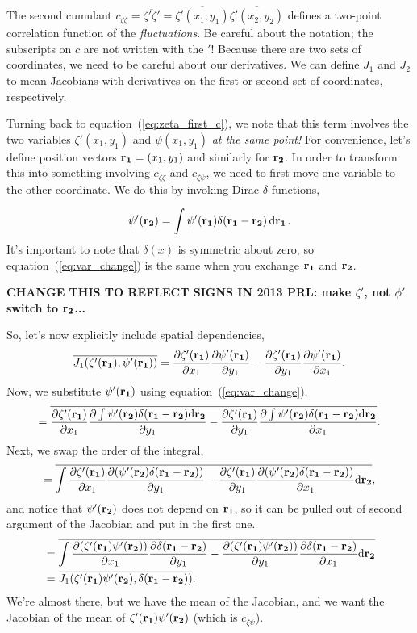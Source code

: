 \documentclass{paper}
\newcommand*{\mean}[1]{\overline{#1}}
\newcommand{\czz}{c_{\zeta\zeta}}
\newcommand{\czp}{c_{\zeta\psi}}
\newcommand{\rr}[1]{\vb{r_{#1}}}
\newcommand{\Jac}[3][]{\pdv{#2}{x_{#1}}\pdv{#3}{y_{#1}} - \pdv{#2}{y_{#1}}\pdv{#3}{x_{#1}}}
\begin{document}
The second cumulant $\czz = \mean{\zeta' \zeta'} = \mean{\zeta'(x_1, y_1)} \mean{\zeta'(x_2, y_2)}$ defines a two-point correlation function of the \emph{fluctuations}. Be careful about the notation; the subscripts on $c$ are not written with the $'$! Because there are two sets of coordinates, we need to be careful about our derivatives. We can define $J_1$ and $J_2$ to mean Jacobians with derivatives on the first or second set of coordinates, respectively.

Turning back to equation~(\ref{eq:zeta_first_c}), we note that this term involves the two variables $\zeta'(x_1, y_1)$ and $\psi(x_1, y_1)$ \emph{at the same point!} For convenience, let's define position vectors $\rr1 = (x_1, y_1)$ and similarly for $\rr2$. In order to transform this into something involving $\czz$ and $\czp$, we need to first move one variable to the other coordinate. We do this by invoking Dirac $\delta$ functions,

\begin{equation}
  \label{eq:var_change}
  \psi'(\rr2) = \int \psi'(\rr1) \delta(\rr1 - \rr2) \dd{\rr1}.
\end{equation}
It's important to note that $\delta(x)$ is symmetric about zero, so equation~(\ref{eq:var_change}) is the same when you exchange $\rr1$ and $\rr2$.

\textbf{CHANGE THIS TO REFLECT SIGNS IN 2013 PRL: make $\zeta'$, not $\phi'$ switch to $\rr2$...}

So, let's now explicitly include spatial dependencies,
\begin{equation}
  \label{eq:expanded_J1}
  \mean{J_1(\zeta'(\rr1), \psi'(\rr1))} = \Jac[1]{\zeta'(\rr1)}{\psi'(\rr1)}.
\end{equation}
Now, we substitute $\psi'(\rr1)$ using equation~(\ref{eq:var_change}),
\begin{equation}
  \label{eq:expanded_J1_int}
  = \mean{\Jac[1]{\zeta'(\rr1)}{\int \psi'(\rr2) \delta(\rr1 - \rr2) \dd \rr2}}.
\end{equation}
Next, we swap the order of the integral,
\begin{equation}
  \label{eq:expanded_J1_int_swap}
  = \mean{\int{\Jac[1]{\zeta'(\rr1)}{(\psi'(\rr2) \delta(\rr1 - \rr2)) }\dd \rr2}},
\end{equation}
and notice that $\psi'(\rr2)$ does not depend on $\rr1$, so it can be pulled out of second argument of the Jacobian and put in the first one.
\begin{equation}
  \label{eq:expanded_J1_int_combined}
  \begin{split}
  & = \mean{\int{\Jac[1]{(\zeta'(\rr1)\psi'(\rr2))}{\delta(\rr1 - \rr2) }\dd \rr2}}\\
  & = \mean{J_1(\zeta'(\rr1)\psi'(\rr2),\delta(\rr1 - \rr2))}.
\end{split}
\end{equation}
We're almost there, but we have the mean of the Jacobian, and we want the Jacobian of the mean of $\zeta'(\rr1)\psi'(\rr2)$ (which is $\czp$).
\end{document}
